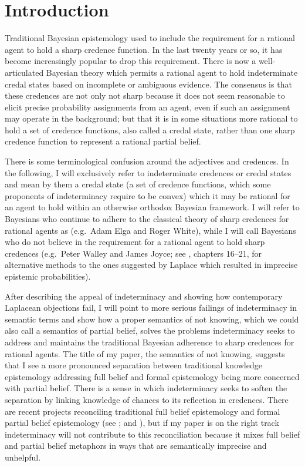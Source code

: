 \section{Introduction}
\label{Introduction}

Traditional Bayesian epistemology used to include the requirement for a rational agent to hold a sharp credence function. In the last twenty years or so, it has become increasingly popular to drop this requirement. There is now a well-articulated Bayesian theory which permits a rational agent to hold indeterminate credal states based on incomplete or ambiguous evidence. The consensus is that these credences are not only not sharp because it does not seem reasonable to elicit precise probability assignments from an agent, even if such an assignment may operate in the background; but that it is in some situations more rational to hold a set of credence functions, also called a credal state, rather than one sharp credence function to represent a rational partial belief.

There is some terminological confusion around the adjectives   and  credences. In the following, I will exclusively refer to indeterminate credences or credal states and mean by them a credal state (a set of credence functions, which some proponents of indeterminacy require to be convex) which it may be rational for an agent to hold within an otherwise orthodox Bayesian framework. I will refer to Bayesians who continue to adhere to the classical theory of sharp credences for rational agents as  (e.g.\ Adam Elga and Roger White), while I will call Bayesians who do not believe in the requirement for a rational agent to hold sharp credences  (e.g.\ Peter Walley and James Joyce; see , chapters 16--21, for alternative methods to the ones suggested by Laplace which resulted in imprecise epistemic probabilities).

After describing the appeal of indeterminacy and showing how contemporary Laplacean objections fail, I will point to more serious failings of indeterminacy in semantic terms and show how a proper semantics of not knowing, which we could also call a semantics of partial belief, solves the problems indeterminacy seeks to address and maintains the traditional Bayesian adherence to sharp credences for rational agents. The title of my paper, the semantics of not knowing, suggests that I see a more pronounced separation between traditional knowledge epistemology addressing full belief and formal epistemology being more concerned with partial belief. There is a sense in which indeterminacy seeks to soften the separation by linking knowledge of chances to its reflection in credences. There are recent projects reconciling traditional full belief epistemology and formal partial belief epistemology (see ; and ), but if my paper is on the right track indeterminacy will not contribute to this reconciliation because it mixes full belief and partial belief metaphors in ways that are semantically imprecise and unhelpful.

